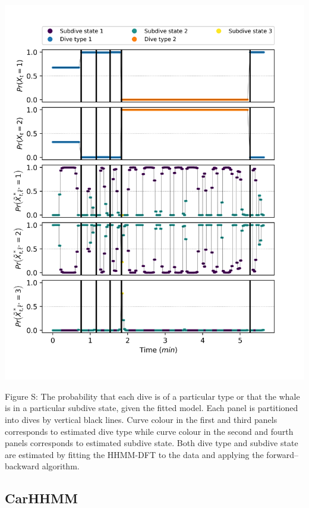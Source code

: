 \documentclass{article}
\begin{document}
        \begin{center}
        \includegraphics[width=6in]{../Plots/2019/20190902-182840-CATs_OB_1_0_267_HHMM_decoded_states.png}
        \end{center}
        
        \noindent Figure S: The probability that each dive is of a particular type or that the whale is in a particular subdive state, given the fitted model. Each panel is partitioned into dives by vertical black lines. Curve colour in the first and third panels corresponds to estimated dive type while curve colour in the second and fourth panels corresponds to estimated subdive state. Both dive type and subdive state are estimated by fitting the HHMM-DFT to the data and applying the forward--backward algorithm.
        \addtocounter{fignum}{1}
        
        \subsection{CarHHMM}
        
\end{document}
